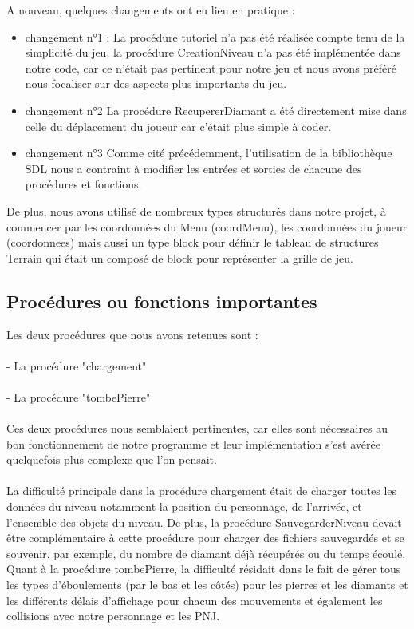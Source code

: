         A nouveau, quelques changements ont eu lieu en pratique : 
        \begin{itemize}
            \item changement n°1 : La procédure tutoriel n'a pas été réalisée compte tenu de la simplicité du jeu, la procédure CreationNiveau n'a pas été implémentée dans notre code, car ce n'était pas pertinent pour notre jeu et nous avons préféré nous focaliser sur des aspects plus importants du jeu.
            \item changement n°2 La procédure RecupererDiamant a été directement mise dans celle du déplacement du joueur car c'était plus simple à coder.
            \item changement n°3 Comme cité précédemment, l'utilisation de la bibliothèque SDL nous a contraint à modifier les entrées et sorties de chacune des procédures et fonctions.
        \end{itemize}
        
        
        De plus, nous avons utilisé de nombreux types structurés dans notre projet, à commencer par les coordonnées du Menu (coordMenu), les coordonnées du joueur (coordonnees) mais aussi un type block pour définir le tableau de structures Terrain qui était un composé de block pour représenter la grille de jeu.
        
        
        
        
        
        
        
    \subsection{Procédures ou fonctions importantes}
       Les deux procédures que nous avons retenues sont :
       \\
       \\
       - La procédure "chargement"
       \\
       \\
       - La procédure "tombePierre"
        \\
        \\
        Ces deux procédures nous semblaient pertinentes, car elles sont nécessaires au bon fonctionnement de notre programme et leur implémentation s'est avérée quelquefois plus complexe que l'on pensait.
        \\
        \\
        La difficulté principale dans la procédure chargement était de charger toutes les données du niveau notamment la position du personnage, de l'arrivée, et l'ensemble des objets du niveau. De plus, la procédure SauvegarderNiveau devait être complémentaire à cette procédure pour charger des fichiers sauvegardés et se souvenir, par exemple, du nombre de diamant déjà récupérés ou du temps écoulé.
        Quant à la procédure tombePierre, la difficulté résidait dans le fait de gérer tous les types d'éboulements (par le bas et les côtés) pour les pierres et les diamants et les différents délais d'affichage pour chacun des mouvements et également les collisions avec notre personnage et les PNJ. 
        \\
        \\
\newpage

